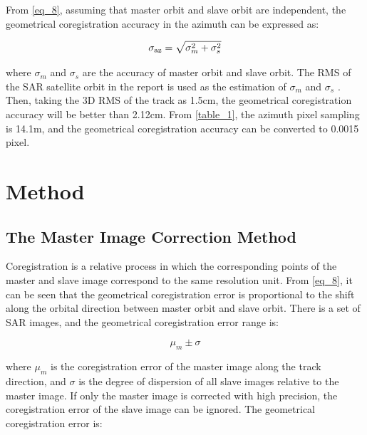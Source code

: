 \documentclass[a4paper,fleqn]{cas-sc}
\begin{document}
From \ref{eq_8}, assuming that master orbit and slave orbit are independent, the geometrical coregistration accuracy in the azimuth can be expressed as: \par

\begin{equation}
    \sigma_{\rm az} = \sqrt{\sigma_m^2 + \sigma_s^2}
    \label{eq_9}
\end{equation}

\noindent where $\sigma_m$ and $\sigma_s$ are the accuracy of master orbit and slave orbit. The RMS of the SAR satellite orbit in the report is used as the estimation of $\sigma_m$ and $\sigma_s$ \cite{InSAR_uncertainty_due_to_orbital_errors}. Then, taking the 3D RMS of the track as 1.5cm, the geometrical coregistration accuracy will be better than 2.12cm. From \ref{table_1}, the azimuth pixel sampling is 14.1m, and the geometrical coregistration accuracy can be converted to 0.0015 pixel. \par


\section{Method}

\subsection{The Master Image Correction Method}

Coregistration is a relative process in which the corresponding points of the master and slave image correspond to the same resolution unit. From \ref{eq_8}, it can be seen that the geometrical coregistration error is proportional to the shift along the orbital direction between master orbit and slave orbit. There is a set of SAR images, and the geometrical coregistration error range is: \par

\begin{equation}
    \mu_m \pm \sigma
    \label{eq_10}
\end{equation}

\noindent where $\mu_m$ is the coregistration error of the master image along the track direction, and $\sigma$ is the degree of dispersion of all slave images relative to the master image. If only the master image is corrected with high precision, the coregistration error of the slave image can be ignored. The geometrical coregistration error is: \par
\end{document}
